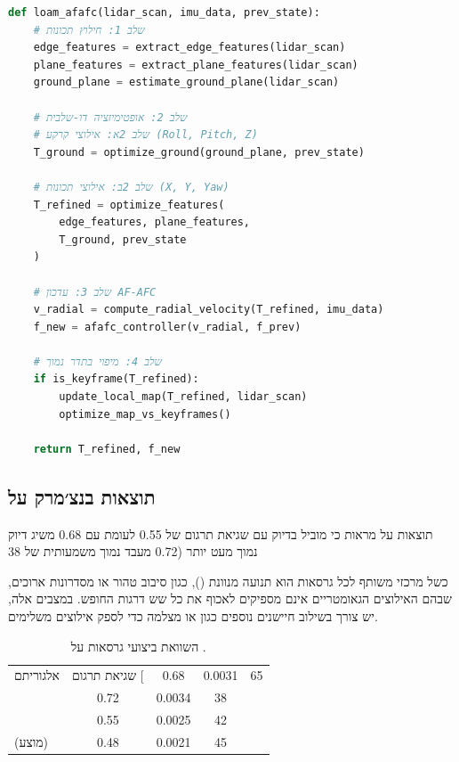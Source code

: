 \begin{lstlisting}[language=Python, caption=אלגוריתם LOAM מורחב עם AF-AFC, label=lst:loam_afafc]
def loam_afafc(lidar_scan, imu_data, prev_state):
    # שלב 1: חילוץ תכונות
    edge_features = extract_edge_features(lidar_scan)
    plane_features = extract_plane_features(lidar_scan)
    ground_plane = estimate_ground_plane(lidar_scan)
    
    # שלב 2: אופטימיזציה דו-שלבית
    # שלב 2א: אילוצי קרקע (Roll, Pitch, Z)
    T_ground = optimize_ground(ground_plane, prev_state)
    
    # שלב 2ב: אילוצי תכונות (X, Y, Yaw)
    T_refined = optimize_features(
        edge_features, plane_features,
        T_ground, prev_state
    )
    
    # שלב 3: עדכון AF-AFC
    v_radial = compute_radial_velocity(T_refined, imu_data)
    f_new = afafc_controller(v_radial, f_prev)
    
    # שלב 4: מיפוי בתדר נמוך
    if is_keyframe(T_refined):
        update_local_map(T_refined, lidar_scan)
        optimize_map_vs_keyframes()
    
    return T_refined, f_new
\end{lstlisting}

\subsection{תוצאות בנצ׳מרק על }
\label{subsec:loam_results}

תוצאות על  מראות כי  מוביל
בדיוק עם שגיאת תרגום של 0.55%
לעומת  עם 0.68%
משיג דיוק נמוך מעט יותר (0.72%
מעבד נמוך משמעותית של 38%

כשל מרכזי משותף לכל גרסאות  הוא תנועה מנוונת
(), כגון סיבוב טהור או מסדרונות ארוכים,
שבהם האילוצים הגאומטריים אינם מספיקים לאכוף את כל שש דרגות
החופש. במצבים אלה, יש צורך בשילוב חיישנים נוספים כגון 
או מצלמה כדי לספק אילוצים משלימים.

\begin{table}[H]
\centering
\begin{tabular}{lccc}
\toprule
אלגוריתם & שגיאת תרגום [%
\midrule
{} & 0.68 & 0.0031 & 65 \\
 & 0.72 & 0.0034 & 38 \\
 & 0.55 & 0.0025 & 42 \\
 (מוצע) & 0.48 & 0.0021 & 45 \\
\bottomrule
\end{tabular}
\caption{השוואת ביצועי גרסאות  על .}
\label{tab:loam_benchmark}
\end{table}

